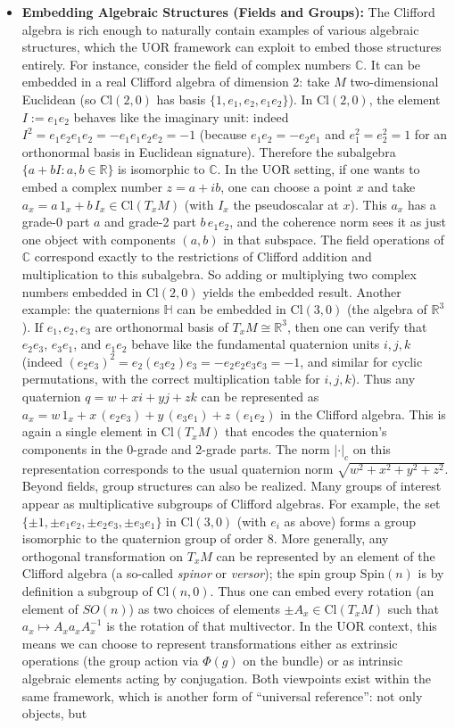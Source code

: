 \documentclass[12pt]{article}
\newcommand{\Cl}{\mathrm{Cl}}
\begin{document}
\begin{itemize}
    \item \textbf{Embedding Algebraic Structures (Fields and Groups):} The Clifford algebra is rich enough to naturally contain examples of various algebraic structures, which the UOR framework can exploit to embed those structures entirely. For instance, consider the field of complex numbers $\mathbb{C}$. It can be embedded in a real Clifford algebra of dimension 2: take $M$ two-dimensional Euclidean (so $\Cl(2,0)$ has basis $\{1, e_1, e_2, e_1 e_2\}$). In $\Cl(2,0)$, the element $I := e_1 e_2$ behaves like the imaginary unit: indeed $I^2 = e_1 e_2 e_1 e_2 = - e_1 e_1 e_2 e_2 = -1$ (because $e_1 e_2 = - e_2 e_1$ and $e_1^2 = e_2^2 = 1$ for an orthonormal basis in Euclidean signature). Therefore the subalgebra $\{a + bI : a,b \in \mathbb{R}\}$ is isomorphic to $\mathbb{C}$. In the UOR setting, if one wants to embed a complex number $z = a + ib$, one can choose a point $x$ and take $a_x = a\,1_x + b\,I_x \in \Cl(T_xM)$ (with $I_x$ the pseudoscalar at $x$). This $a_x$ has a grade-0 part $a$ and grade-2 part $b\,e_1 e_2$, and the coherence norm sees it as just one object with components $(a, b)$ in that subspace. The field operations of $\mathbb{C}$ correspond exactly to the restrictions of Clifford addition and multiplication to this subalgebra. So adding or multiplying two complex numbers embedded in $\Cl(2,0)$ yields the embedded result. Another example: the quaternions $\mathbb{H}$ can be embedded in $\Cl(3,0)$ (the algebra of $\mathbb{R}^3$). If $e_1, e_2, e_3$ are orthonormal basis of $T_xM \cong \mathbb{R}^3$, then one can verify that $e_2 e_3$, $e_3 e_1$, and $e_1 e_2$ behave like the fundamental quaternion units $i,j,k$ (indeed $(e_2 e_3)^2 = e_2 (e_3 e_2) e_3 = - e_2 e_2 e_3 e_3 = -1$, and similar for cyclic permutations, with the correct multiplication table for $i,j,k$). Thus any quaternion $q = w + x i + y j + z k$ can be represented as $a_x = w\,1_x + x\,(e_2 e_3) + y\,(e_3 e_1) + z\,(e_1 e_2)$ in the Clifford algebra. This is again a single element in $\Cl(T_xM)$ that encodes the quaternion’s components in the 0-grade and 2-grade parts. The norm $|\cdot|_c$ on this representation corresponds to the usual quaternion norm $\sqrt{w^2+x^2+y^2+z^2}$. Beyond fields, group structures can also be realized. Many groups of interest appear as multiplicative subgroups of Clifford algebras. For example, the set $\{\pm 1, \pm e_1 e_2, \pm e_2 e_3, \pm e_3 e_1\}$ in $\Cl(3,0)$ (with $e_i$ as above) forms a group isomorphic to the quaternion group of order 8. More generally, any orthogonal transformation on $T_xM$ can be represented by an element of the Clifford algebra (a so-called \emph{spinor} or \emph{versor}); the spin group $\mathrm{Spin}(n)$ is by definition a subgroup of $\Cl(n,0)$. Thus one can embed every rotation (an element of $SO(n)$) as two choices of elements $\pm A_x \in \Cl(T_xM)$ such that $a_x \mapsto A_x a_x A_x^{-1}$ is the rotation of that multivector. In the UOR context, this means we can choose to represent transformations either as extrinsic operations (the group action via $\Phi(g)$ on the bundle) or as intrinsic algebraic elements acting by conjugation. Both viewpoints exist within the same framework, which is another form of “universal reference”: not only objects, but 
\end{itemize}
\end{document}
